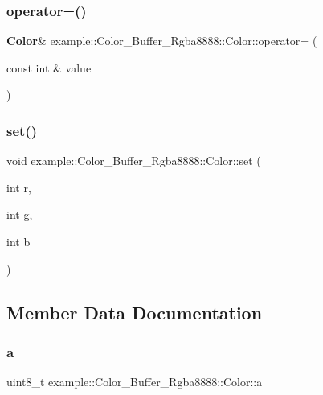 \subsubsection{operator=()}
{\footnotesize\ttfamily \textbf{ Color}\& example\+::\+Color\+\_\+\+Buffer\+\_\+\+Rgba8888\+::\+Color\+::operator= (\begin{DoxyParamCaption}\item[{const int \&}]{value }\end{DoxyParamCaption})\hspace{0.3cm}{\ttfamily [inline]}}

\mbox{\label{structexample_1_1_color___buffer___rgba8888_1_1_color_ab468e761b5196e508eff6cf396d50cce}} 
\subsubsection{set()}
{\footnotesize\ttfamily void example\+::\+Color\+\_\+\+Buffer\+\_\+\+Rgba8888\+::\+Color\+::set (\begin{DoxyParamCaption}\item[{int}]{r,  }\item[{int}]{g,  }\item[{int}]{b }\end{DoxyParamCaption})\hspace{0.3cm}{\ttfamily [inline]}}



\subsection{Member Data Documentation}
\mbox{\label{structexample_1_1_color___buffer___rgba8888_1_1_color_ac93fe62cb2f57a798639f74a547293be}} 
\subsubsection{a}
{\footnotesize\ttfamily uint8\+\_\+t example\+::\+Color\+\_\+\+Buffer\+\_\+\+Rgba8888\+::\+Color\+::a}

\mbox{\label{structexample_1_1_color___buffer___rgba8888_1_1_color_a9213fba01a28ef7dbe871fe2669a0226}} 
